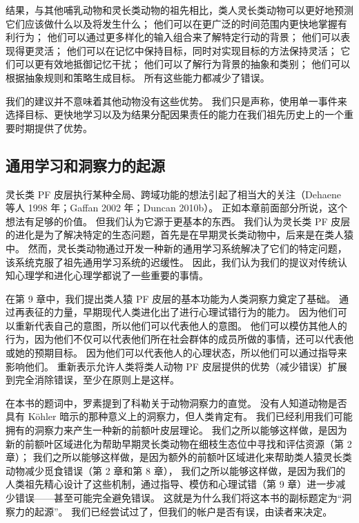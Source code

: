 \par 
结果，与其他哺乳动物和灵长类动物的祖先相比，类人灵长类动物可以更好地预测它们应该做什么以及将发生什么； 他们可以在更广泛的时间范围内更快地掌握有利行为； 他们可以通过更多样化的输入组合来了解特定行动的背景； 他们可以表现得更灵活； 他们可以在记忆中保持目标，同时对实现目标的方法保持灵活； 它们可以更有效地抵御记忆干扰； 他们可以了解行为背景的抽象和类别； 他们可以根据抽象规则和策略生成目标。 所有这些能力都减少了错误。
\par 
我们的建议并不意味着其他动物没有这些优势。 我们只是声称，使用单一事件来选择目标、更快地学习以及为结果分配因果责任的能力在我们祖先历史上的一个重要时期提供了优势。
\subsection{通用学习和洞察力的起源}
灵长类 PF 皮层执行某种全局、跨域功能的想法引起了相当大的关注（Dehaene 等人 1998 年；Gaffan 2002 年；Duncan 2010b）。 正如本章前面部分所说，这个想法有足够的价值。 但我们认为它源于更基本的东西。 我们认为灵长类 PF 皮层的进化是为了解决特定的生态问题，首先是在早期灵长类动物中，后来是在类人猿中。 然而，灵长类动物通过开发一种新的通用学习系统解决了它们的特定问题，该系统克服了祖先通用学习系统的迟缓性。 因此，我们认为我们的提议对传统认知心理学和进化心理学都说了一些重要的事情。
\par 
在第 9 章中，我们提出类人猿 PF 皮层的基本功能为人类洞察力奠定了基础。 通过再表征的力量，早期现代人类进化出了进行心理试错行为的能力。 因为他们可以重新代表自己的意图，所以他们可以代表他人的意图。 他们可以模仿其他人的行为，因为他们不仅可以代表他们所在社会群体的成员所做的事情，还可以代表他或她的预期目标。 因为他们可以代表他人的心理状态，所以他们可以通过指导来影响他们。 重新表示允许人类将类人动物 PF 皮层提供的优势（减少错误）扩展到完全消除错误，至少在原则上是这样。
\par 
在本书的题词中，罗素提到了科勒关于动物洞察力的直觉。 没有人知道动物是否具有 Köhler 暗示的那种意义上的洞察力，但人类肯定有。 我们已经利用我们可能拥有的洞察力来产生一种新的前额叶皮层理论。 我们之所以能够这样做，是因为新的前额叶区域进化为帮助早期灵长类动物在细枝生态位中寻找和评估资源（第 2 章）； 我们之所以能够这样做，是因为额外的前额叶区域进化来帮助类人猿灵长类动物减少觅食错误（第 2 章和第 8 章）， 我们之所以能够这样做，是因为我们的人类祖先精心设计了这些机制，通过指导、模仿和心理试错（第 9 章）进一步减少错误——甚至可能完全避免错误。 这就是为什么我们将这本书的副标题定为“洞察力的起源”。 我们已经尝试过了，但我们的帐户是否有误，由读者来决定。
